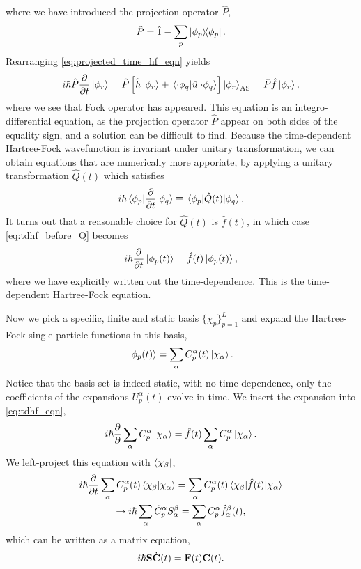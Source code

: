 where we have introduced the projection operator $\hat{P}$, 
\begin{equation}
    \hat{P} = \hat{1} - \sum_p \outerproduct{\phi_p}.
\end{equation}
Rearranging \autoref{eq:projected_time_hf_eqn} yields
\begin{equation}
    \label{eq:tdhf_before_Q}
    i\hbar \hat{P}\frac{\partial}{\partial t} \ket{\phi_r} 
    = \hat{P}\left[\hat{h}\ket{\phi_r} 
        + \mel{\cdot\phi_q}{\hat{u}}{\cdot\phi_q} \right]\ket{\phi_r}_\text{AS}
    = \hat{P}\hat{f}\ket{\phi_r},
\end{equation}
where we see that Fock operator has appeared. This equation is an integro-differential 
equation, as the projection operator $\hat{P}$ appear on both sides of the equality 
sign, and a solution can be difficult to find. Because the time-dependent Hartree-Fock 
wavefunction is invariant under unitary transformation, we can obtain equations that are 
numerically more apporiate, by applying a unitary transformation $\hat{Q}(t)$ which 
satisfies
\begin{equation}
    i\hbar\mel{\phi_p}{\frac{\partial}{\partial t}}{\phi_q}
    \equiv \mel{\phi_p}{\hat{Q}(t)}{\phi_q}.
\end{equation}
It turns out that a reasonable choice for $\hat{Q}(t)$ is $\hat{f}(t)$, in which case 
\autoref{eq:tdhf_before_Q} becomes
\begin{equation}
    \label{eq:tdhf_eqn}
    i\hbar\frac{\partial}{\partial t}\ket{\phi_p(t)} = \hat{f}(t)\ket{\phi_p(t)},
\end{equation}
where we have explicitly written out the time-dependence. This is the time-dependent 
Hartree-Fock equation.

Now we pick a specific, finite and static basis $\{\chi_p\}_{p=1}^{L}$ and expand the Hartree-Fock single-particle
functions in this basis,
\begin{equation}
    \ket{\phi_p(t)} = \sum_\alpha C^\alpha_p(t) \ket{\chi_\alpha}.
\end{equation}
Notice that the basis set is indeed static, with no time-dependence, only the coefficients 
of the expansions $U^\alpha_p(t)$ evolve in time.  
We insert the expansion into \autoref{eq:tdhf_eqn},
\begin{equation}
    i\hbar\frac{\partial}{\partial}\sum_\alpha C^\alpha_p \ket{\chi_\alpha} = \hat{f}(t)\sum_\alpha C^\alpha_p \ket{\chi_\alpha}.
\end{equation}
We left-project this equation with $\bra{\chi_\beta}$,
\begin{equation}
    \begin{gathered}
    i\hbar\frac{\partial}{\partial t} \sum_\alpha C^\alpha_p(t)\braket{\chi_\beta}{\chi_\alpha}
        = \sum_\alpha C^\alpha_p(t) \mel{\chi_\beta}{\hat{f}(t)}{\chi_\alpha}  \\
    \to i\hbar \sum_\alpha \dot{C}^\alpha_p S^\beta_\alpha = \sum_\alpha C^\alpha_p\hat{f}^\beta_\alpha(t),
    \end{gathered}
\end{equation}
which can be written as a matrix equation,
\begin{equation}
    i\hbar \vb{S}\dot{\vb{C}}(t) = \vb{F}(t)\vb{C}(t).
\end{equation}
